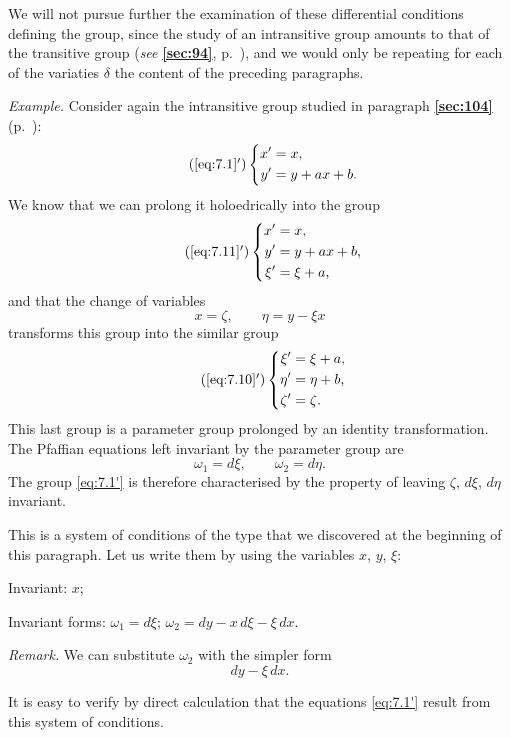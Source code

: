 \documentclass[leqno,11pt]{book}
\numberwithin{equation}{chapter}
\theoremstyle{shape1}
\theoremstyle{shapesmall}
\newcommand{\fsref}[1]{{\rm\textsection\textbf{\ref{sec:#1}}}}
\newcommand{\somespace}{\vspace{9pt}}
\begin{document}
We will not pursue further the examination of these differential conditions defining the group, since the study of an intransitive group amounts to that of the transitive group (\emph{see} \fsref{94}, p.~\pageref{sec:94}), and we would only be repeating for each of the variaties $\delta$ the content of the preceding paragraphs.

\somespace
{\small

\emph{Example.} Consider again the intransitive group studied in paragraph \fsref{104} (p.~\pageref{sec:104}):
\begin{equation}
  \tag{\ref{eq:7.1}$'$}
  \left\{
    \begin{aligned}
      x'&=x,\\
      y'&=y+ax+b.
    \end{aligned}
  \right.
\end{equation}
We know that we can prolong it holoedrically into the group
\begin{equation}
  \tag{\ref{eq:7.11}$'$}
  \left\{
    \begin{aligned}
      x'&=x,\\
      y'&=y+ax+b,\\
      \xi'&=\xi+a,
    \end{aligned}
  \right.
\end{equation}
and that the change of variables
\begin{equation}
  \tag{12$'$}
  x=\zeta,\qquad \eta=y-\xi x
\end{equation}
transforms this group into the similar group
\begin{equation}
  \tag{\ref{eq:7.10}$'$}
  \left\{
    \begin{aligned}
      \xi'&=\xi+a,\\
      \eta'&=\eta+b,\\
      \zeta'&=\zeta.
    \end{aligned}
  \right.
\end{equation}
This last group is a parameter group prolonged by an identity transformation. The Pfaffian equations left invariant by the parameter group are
\[
\omega_{1}=d\xi,\qquad\omega_{2}=d\eta.
\]
The group \eqref{eq:7.1'} is therefore characterised by the property of leaving $\zeta$, $d\xi$, $d\eta$ invariant.

This is a system of conditions of the type that we discovered at the beginning of this paragraph. Let us write them by using the variables $x$, $y$, $\xi$:

\somespace

Invariant: $x$;

\somespace

Invariant forms: $\omega_{1}=d\xi$; $\omega_{2}=dy-x\,d\xi-\xi\,dx$.

\somespace

\emph{Remark.} We can substitute $\omega_{2}$ with the simpler form
\[
dy-\xi\,dx.
\]

It is easy to verify by direct calculation that the equations \eqref{eq:7.1'} result from this system of conditions.
}
\end{document}
